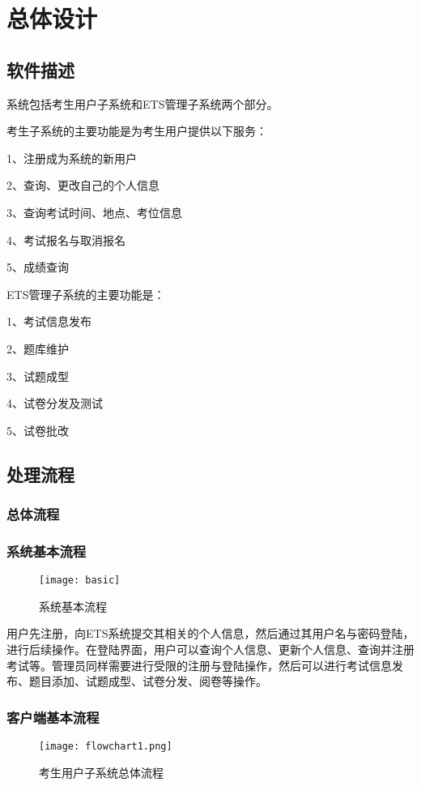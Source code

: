 \chapter{总体设计}
\section{软件描述}
系统包括考生用户子系统和ETS管理子系统两个部分。

考生子系统的主要功能是为考生用户提供以下服务：

1、注册成为系统的新用户

2、查询、更改自己的个人信息

3、查询考试时间、地点、考位信息

4、考试报名与取消报名

5、成绩查询

ETS管理子系统的主要功能是：

1、考试信息发布

2、题库维护

3、试题成型

4、试卷分发及测试

5、试卷批改

\section{处理流程}
\subsection{总体流程}

\subsection{系统基本流程}
\begin{figure}[ht]
\centering
\texttt{[image: basic]}
\caption{系统基本流程} \label{fig:figure1}
\end{figure}

用户先注册，向ETS系统提交其相关的个人信息，然后通过其用户名与密码登陆，进行后续操作。在登陆界面，用户可以查询个人信息、更新个人信息、查询并注册考试等。管理员同样需要进行受限的注册与登陆操作，然后可以进行考试信息发布、题目添加、试题成型、试卷分发、阅卷等操作。

\subsection{客户端基本流程}
\begin{figure}[ht]
\centering
\texttt{[image: flowchart1.png]}
\caption{考生用户子系统总体流程} \label{fig:figure2}
\end{figure}

